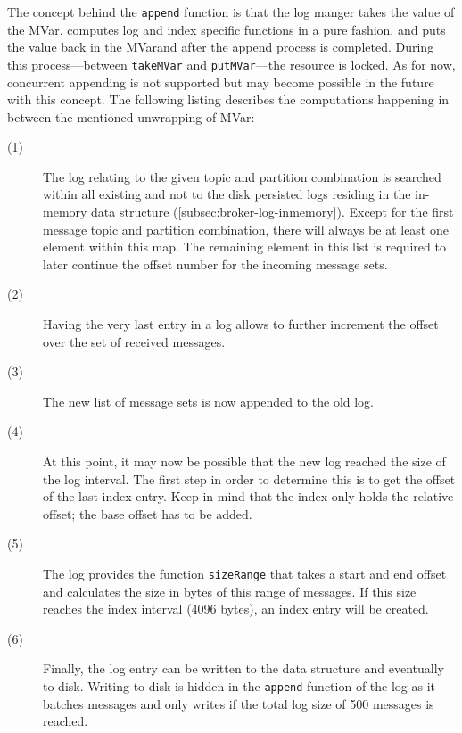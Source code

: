 The concept behind the \lstinline{append} function is that the log manger takes
the value of the MVar, computes log and index specific functions in a pure
fashion, and puts the value back in the
MVarand after the append process is completed. During this process---between \lstinline{takeMVar} and
\lstinline{putMVar}---the resource is locked. As for now, concurrent appending
is not supported but may become possible in the future with this concept. The
following listing describes the computations happening in between the mentioned
unwrapping of MVar:

\begin{description}
  \item[(1)]

    The log relating to the given topic and partition combination is 
    searched within all existing and not to the disk persisted logs residing
    in the in-memory data structure (\ref{subsec:broker-log-inmemory}). Except
    for the first message topic and partition combination, there will always be
    at least one element within this map. The remaining element in this list is
    required to later continue the offset number for the incoming
    message sets.

  \item[(2)]

    Having the very last entry in a log allows to further increment the offset
    over the set of received messages.

  \item[(3)]

    The new list of message sets is now appended to the old log.

  \item[(4)]

    At this point, it may now be possible that the new log reached the size of
    the log interval. The first step in order to determine this is to get the offset
    of the last index entry. Keep in mind that the index only holds the relative
    offset; the base offset has to be added.

  \item[(5)]

    The log provides the function \lstinline{sizeRange} that takes a start and
    end offset and calculates the size in bytes of this range of messages. If
    this size reaches the index interval (4096 bytes), an index entry will be
    created.

  \item[(6)]

    Finally, the log entry can be written to the data structure and eventually to
    disk. Writing to disk is hidden in the \lstinline{append} function of the
    log as it batches messages and only writes if the total log size of 500
    messages is reached.

\end{description}

